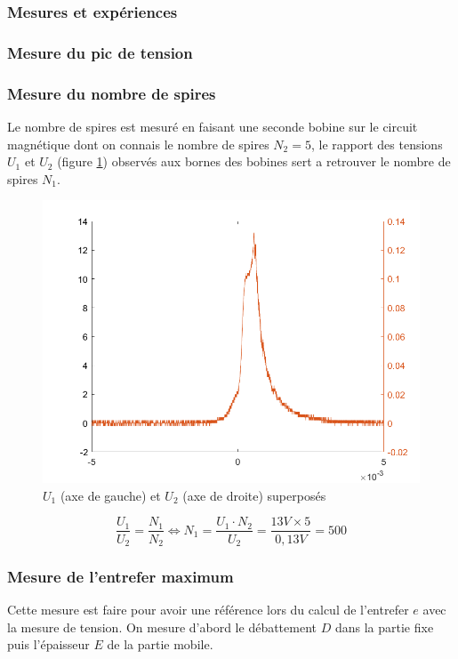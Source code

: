 \documentclass{rapportENS}
\begin{document}
 \subsubsection{Mesures et expériences}
 
 \subsubsection*{Mesure du pic de tension}
 
 
 
 \subsubsection*{Mesure du nombre de spires}
 
 Le nombre de spires est mesuré en faisant une seconde bobine sur le circuit magnétique dont on connais le nombre de spires $N_2 = 5$, le rapport des tensions $U_1$ et $U_2$ (figure \ref{nombredespire}) observés aux bornes des bobines sert a retrouver le nombre de spires $N_1$.
 
 \begin{figure}[h!]
  \centering
 \includegraphics[width = .5\linewidth]{nombredespire.png}
 \caption{$U_1$ (axe de gauche) et $U_2$ (axe de droite) superposés}
 \label{nombredespire}
 \end{figure}
 
 \begin{equation}
     \frac{U_1}{U_2} = \frac{N_1}{N_2} \Leftrightarrow N_1 = \frac{U_1\cdot N_2}{U_2} = \frac{13V \times 5}{0,13V} = 500
 \end{equation}
 
 \subsubsection*{Mesure de l'entrefer maximum}
 
 Cette mesure est faire pour avoir une référence lors du calcul de l'entrefer $e$ avec la mesure de tension. On mesure d'abord le débattement $D$ dans la partie fixe puis l'épaisseur $E$ de la partie mobile.
 
\end{document}
